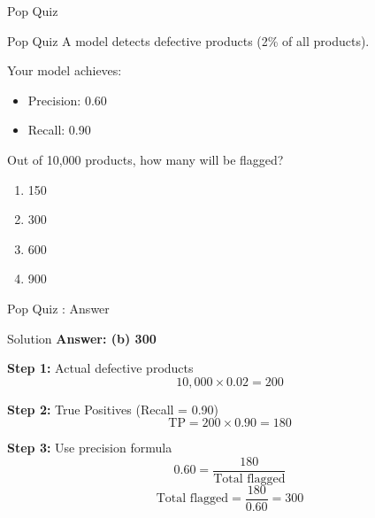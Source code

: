 \documentclass{beamer}
\newcounter{popquiz}
\begin{document}
\begin{frame}{Pop Quiz \thepopquiz}
\begin{popquizbox}{Pop Quiz \thepopquiz}
A model detects defective products (2\% of all products).

\vspace{0.2cm}

Your model achieves:
\begin{itemize}
    \item Precision: 0.60
    \item Recall: 0.90
\end{itemize}

\vspace{0.2cm}

Out of 10,000 products, how many will be flagged?
\end{popquizbox}

\vspace{0.15cm}

\begin{enumerate}
    \item 150
    \item 300
    \item 600
    \item 900
\end{enumerate}
\end{frame}

\begin{frame}{Pop Quiz \thepopquiz: Answer}
\begin{examplebox}{Solution}
\small
\textbf{Answer: (b) 300}
\end{examplebox}

\vspace{0.15cm}

\textbf{Step 1:} Actual defective products
$$10{,}000 \times 0.02 = 200$$

\textbf{Step 2:} True Positives (Recall = 0.90)
$$\text{TP} = 200 \times 0.90 = 180$$

\textbf{Step 3:} Use precision formula
$$0.60 = \frac{180}{\text{Total flagged}}$$
$$\text{Total flagged} = \frac{180}{0.60} = 300$$
\end{frame}
\end{document}
